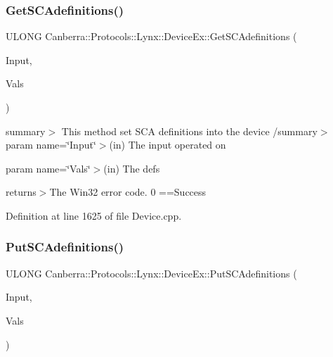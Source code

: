 \subsubsection{\texorpdfstring{Get\+S\+C\+Adefinitions()}{GetSCAdefinitions()}}
{\footnotesize\ttfamily U\+L\+O\+NG Canberra\+::\+Protocols\+::\+Lynx\+::\+Device\+Ex\+::\+Get\+S\+C\+Adefinitions (\begin{DoxyParamCaption}\item[{U\+S\+H\+O\+RT}]{Input,  }\item[{\hyperlink{class_canberra_1_1_data_types_1_1_spectroscopy_1_1_s_c_adefinitions}{Canberra\+::\+Data\+Types\+::\+Spectroscopy\+::\+S\+C\+Adefinitions} \&}]{Vals }\end{DoxyParamCaption})}

summary$>$ This method set S\+CA definitions into the device /summary$>$ param name=\char`\"{}\+Input\char`\"{}$>$(in) The input operated on

param name=\char`\"{}\+Vals\char`\"{}$>$(in) The defs

returns$>$The Win32 error code. 0 ==Success

Definition at line 1625 of file Device.\+cpp.

\mbox{\label{class_canberra_1_1_protocols_1_1_lynx_1_1_device_ex_afd12d1dce85502d5a2aeb4c80b88946b_afd12d1dce85502d5a2aeb4c80b88946b}} 
\subsubsection{\texorpdfstring{Put\+S\+C\+Adefinitions()}{PutSCAdefinitions()}}
{\footnotesize\ttfamily U\+L\+O\+NG Canberra\+::\+Protocols\+::\+Lynx\+::\+Device\+Ex\+::\+Put\+S\+C\+Adefinitions (\begin{DoxyParamCaption}\item[{U\+S\+H\+O\+RT}]{Input,  }\item[{\hyperlink{class_canberra_1_1_data_types_1_1_spectroscopy_1_1_s_c_adefinitions}{Canberra\+::\+Data\+Types\+::\+Spectroscopy\+::\+S\+C\+Adefinitions} \&}]{Vals }\end{DoxyParamCaption})}

